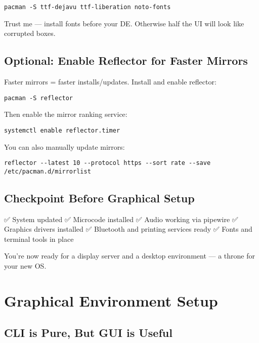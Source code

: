 \documentclass[12pt,openany]{book}
\begin{document}
\begin{lstlisting}
pacman -S ttf-dejavu ttf-liberation noto-fonts
\end{lstlisting}

Trust me — install fonts before your DE. Otherwise half the UI will look like corrupted boxes.

\section{Optional: Enable Reflector for Faster Mirrors}

Faster mirrors = faster installs/updates. Install and enable reflector:

\begin{lstlisting}
pacman -S reflector
\end{lstlisting}

Then enable the mirror ranking service:

\begin{lstlisting}
systemctl enable reflector.timer
\end{lstlisting}

You can also manually update mirrors:

\begin{lstlisting}
reflector --latest 10 --protocol https --sort rate --save /etc/pacman.d/mirrorlist
\end{lstlisting}

\section{Checkpoint Before Graphical Setup}

✅ System updated  
✅ Microcode installed  
✅ Audio working via pipewire  
✅ Graphics drivers installed  
✅ Bluetooth and printing services ready  
✅ Fonts and terminal tools in place  

You're now ready for a display server and a desktop environment — a throne for your new OS.

\clearpage


\chapter{Graphical Environment Setup}

\section*{CLI is Pure, But GUI is Useful}
\end{document}
